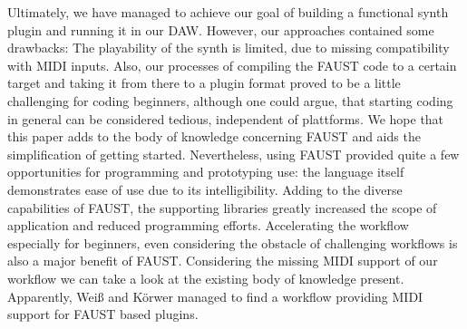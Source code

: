 \documentclass{aes2e}
\begin{document}
Ultimately, we have managed to achieve our goal of building a functional synth plugin and running it in our DAW. However, our approaches contained some drawbacks: The playability of the synth is limited, due to missing compatibility with MIDI inputs. Also, our processes of compiling the FAUST code to a certain target and taking it from there to a plugin format proved to be a little challenging for coding beginners, although one could argue, that starting coding in general can be considered tedious, independent of plattforms. We hope that this paper adds to the body of knowledge concerning FAUST and aids the simplification of getting started. 
Nevertheless, using FAUST provided quite a few opportunities for programming and prototyping use: the language itself demonstrates ease of use due to its intelligibility. Adding to the diverse capabilities of FAUST, the supporting libraries greatly increased the scope of application and reduced programming efforts. Accelerating the workflow especially for beginners, even considering the obstacle of challenging workflows is also a major benefit of FAUST.
Considering the missing MIDI support of our workflow we can take a look at the existing body of knowledge present. Apparently, Weiß and Körwer \cite{Weiss2020} managed to find a workflow providing MIDI support for FAUST based plugins.



\end{document}
